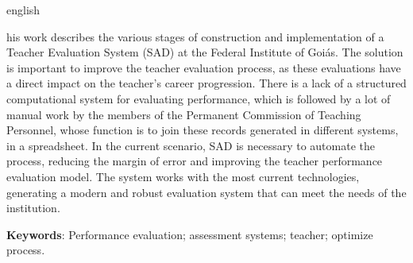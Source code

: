 \begin{resumo}[Abstract]
 \begin{otherlanguage*}{english}

his work describes the various stages of construction and implementation of a Teacher Evaluation System (SAD) at the Federal Institute of Goiás. The solution is important to improve the teacher evaluation process, as these evaluations have a direct impact on the teacher's career progression.
There is a lack of a structured computational system for evaluating performance, which is followed by a lot of manual work by the members of the Permanent Commission of Teaching Personnel, whose function is to join these records generated in different systems, in a spreadsheet.
In the current scenario, SAD is necessary to automate the process, reducing the margin of error and improving the teacher performance evaluation model. The system works with the most current technologies, generating a modern and robust evaluation system that can meet the needs of the institution.

   \vspace{\onelineskip}

   \noindent
   \textbf{Keywords}: Performance evaluation; assessment systems; teacher; optimize process.
 \end{otherlanguage*}
\end{resumo} 